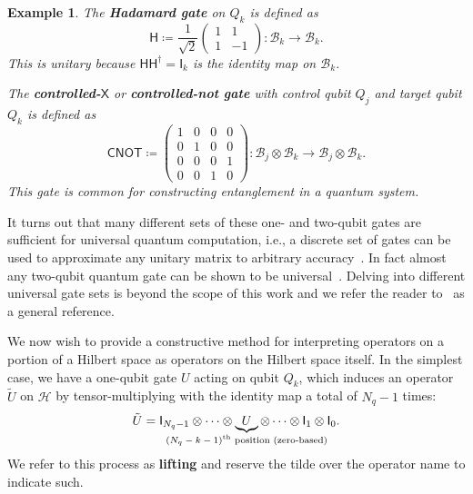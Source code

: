 \documentclass[conference]{IEEEtran}
\newcommand{\defn}[1]{\textbf{#1}}
\newcommand{\CNOT}{\ensuremath{\mathsf{CNOT}}}
\newcommand{\Hil}{\ensuremath{\mathscr{H}}}
\newcommand{\BHil}{\ensuremath{\mathscr{B}}}
\newcommand{\Id}{\mathsf{I}}
\newtheorem{example}{Example}
\begin{document}
\begin{example}
The \defn{Hadamard gate} on $Q_k$ is defined as
\begin{equation*}
\mathsf{H} \coloneqq \frac{1}{\sqrt{2}}
\begin{pmatrix}
1 & 1\\
1 & -1
\end{pmatrix} : \BHil_k\to\BHil_k.
\end{equation*}
This is unitary because $\mathsf{H}\mathsf{H}^{\dagger} = \Id_k$ is the identity map on $\BHil_k$.

The \defn{controlled-$\mathsf{X}$} or \defn{controlled-not gate} with \emph{control qubit} $Q_j$ and \emph{target qubit} $Q_k$ is defined as
\begin{equation*}
\CNOT \coloneqq
\begin{pmatrix}
1 & 0 & 0 & 0\\
0 & 1 & 0 & 0\\
0 & 0 & 0 & 1\\
0 & 0 & 1 & 0
\end{pmatrix} : \BHil_j\otimes\BHil_k\to\BHil_j\otimes\BHil_k.
\end{equation*}
This gate is common for constructing \emph{entanglement} in a quantum system.
\end{example}

It turns out that many different sets of these one- and two-qubit gates are sufficient for universal quantum computation, i.e., a discrete set of gates can be used to approximate any unitary matrix to arbitrary accuracy~\cite{barenco1995elementary, nielsen2010quantum}. In fact almost any two-qubit quantum gate can be shown to be universal~\cite{deutsch1995universality}. Delving into different universal gate sets is beyond the scope of this work and we refer the reader to~\cite{nielsen2010quantum} as a general reference. 

We now wish to provide a constructive method for interpreting operators on a portion of a Hilbert space as operators on the Hilbert space itself. In the simplest case, we have a one-qubit gate $U$ acting on qubit $Q_k$, which induces an operator $\tilde U$ on $\Hil$ by tensor-multiplying with the identity map a total of $N_q-1$ times:
\begin{equation}\label{eq:tensorone}
\tilde U = \Id_{N_q-1} \otimes \cdots \otimes \underbrace{U}_{\mathclap{\text{$(N_q-k-1)$\textsuperscript{th} position (zero-based)}}} \otimes \cdots \otimes \Id_1 \otimes \Id_0.
\end{equation}
We refer to this process as \defn{lifting} and reserve the tilde over the operator name to indicate such.
\end{document}
